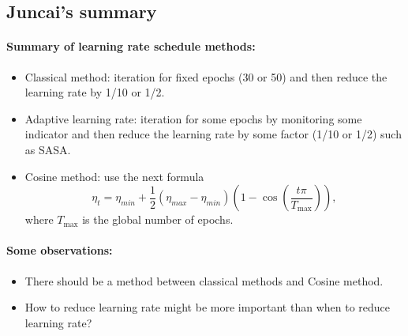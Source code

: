 \newpage
\subsection{Juncai's summary}
\paragraph{Summary of learning rate schedule methods:}
\begin{itemize}
	\item Classical method: iteration for fixed epochs (30 or 50) and then reduce the learning rate by 1/10 or 1/2. 
	\item Adaptive learning rate: iteration for some epochs by monitoring some indicator and then reduce the learning rate by some factor (1/10 or 1/2) such as SASA.
	\item Cosine method: use the next formula
	\begin{equation}\label{key}
	\eta_t = \eta_{min} + \frac{1}{2}(\eta_{max} - \eta_{min}) (1 - \cos(\frac{t\pi}{T_{\max}})),
	\end{equation}
	where $T_{\max}$ is the global number of epochs.
\end{itemize}

\paragraph{Some observations:}
\begin{itemize}
	\item There should be a method between classical methods and Cosine method.
	\item How to reduce learning rate might be more important than when to reduce learning rate?
\end{itemize}

